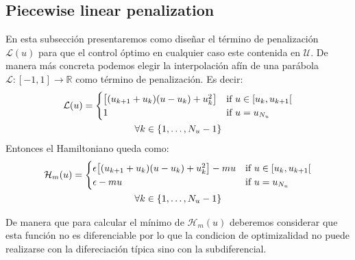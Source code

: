 \subsection{Piecewise linear penalization}

En esta subsección presentaremos como diseñar el término de penalización $\mathcal{L}(u)$ para que el control óptimo en cualquier caso este contenida en $\mathcal{U}$. 
%
De manera más concreta podemos elegir la interpolación afín de una parábola  $\mathcal{L}:[-1,1] \rightarrow \mathbb{R}$ como término de penalización. Es decir:  
\begin{gather}\label{PLP}
    {\mathcal{L}(u)} = \begin{cases}
        \big[ (u_{k+1}+u_{k}) (u-u_k) + u_k^2 \big] & \text{if}  u \in [u_k,u_{k+1}[ \\
        1 & \text{if} \ u = u_{N_u} 
    \end{cases} \\
    \notag \forall k \in \{1,\dots,N_u-1\}
\end{gather}
%
Entonces el Hamiltoniano queda como:
\begin{gather}
    {\mathcal{H}_m(u)} = \begin{cases}
        \epsilon\big[ (u_{k+1}+u_{k}) (u-u_k) + u_k^2 \big] -mu & \text{if}  u \in [u_k,u_{k+1}[ \\
        \epsilon-mu & \text{if} \ u = u_{N_u} 
    \end{cases} \\
    \notag \forall k \in \{1,\dots,N_u-1\}
\end{gather}


%
De manera que para calcular el mínimo de $\mathcal{H}_m(u)$ deberemos considerar que esta función no es diferenciable por lo que la condicion de optimizalidad no puede realizarse con la difereciación típica sino con la subdiferencial.

